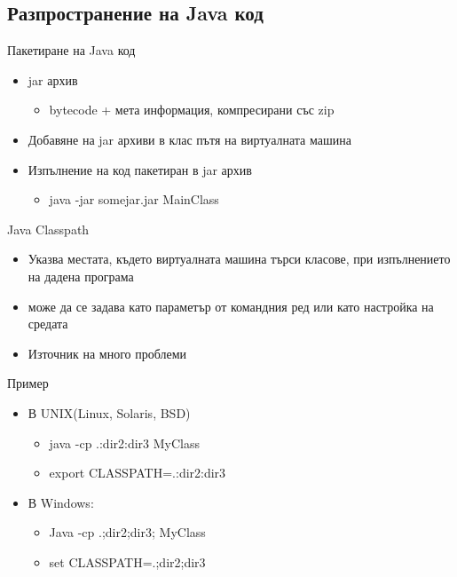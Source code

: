 \documentclass{beamer}
\begin{document}
\subsection{Разпространение на Java код}
\begin{frame}{Пакетиране на Java код}
  \transdissolve
  \begin{itemize}
  \item jar архив
    \begin{itemize}
    \item bytecode + мета информация, компресирани със zip
    \end{itemize} \pause
  \item Добавяне на jar архиви в клас пътя на виртуалната машина \pause
  \item Изпълнение на код пакетиран в jar архив
    \begin{itemize}
    \item java -jar somejar.jar MainClass
    \end{itemize}
  \end{itemize}
\end{frame}

\begin{frame}{Java Classpath}
  \transdissolve
  \begin{itemize}
  \item Указва местата, където виртуалната машина търси класове, при
    изпълнението на дадена програма \pause
  \item може да се задава като параметър от командния ред или като
    настройка на средата \pause
  \item Източник на много проблеми
  \end{itemize}
\end{frame}

\begin{frame}{Пример}
  \transdissolve
  \begin{itemize}
  \item В UNIX(Linux, Solaris, BSD)
      \begin{itemize}
      \item java -cp .:dir2:dir3 MyClass
      \item export CLASSPATH=.:dir2:dir3
      \end{itemize} \pause
    \item В Windows:
      \begin{itemize}
      \item Java -cp .;dir2;dir3; MyClass
      \item set CLASSPATH=.;dir2;dir3
      \end{itemize}
  \end{itemize}
\end{frame}
\end{document}
